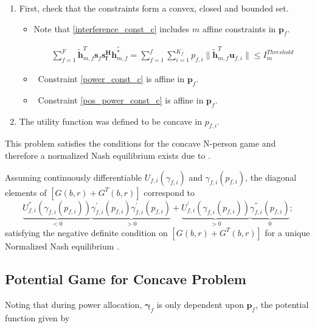 \begin{enumerate}


\item
First, check that the constraints form a convex, closed and bounded set. 

\begin{itemize}

\item
	Note that \eqref{interference_const_c} includes $m$ affine constraints in $\mathbf{p}_{f}$.

\begin{gather*}
	  \sum^F_{f=1} \tilde{\mathbf{h}}_{m,f}^T  \mathbf{s}_{f} 						
	\mathbf{s_{f}^{H}} \tilde{\mathbf{h}_{m,f}^*} 
	=
	\sum_{f=1}^{f}	\sum_{i=1}^{K_f}
	p_{f,i}\|\tilde{\mathbf{h}}_{m,f}^T \mathbf{u}_{f,i}\|
	\leq I^{Threshold}_{m} 
\end{gather*}

\item \
	Constraint \eqref{power_const_c} is  affine in $\mathbf{p}_{f}$.
	
\item \
	Constraint \eqref{pos_power_const_c} is affine in $\mathbf{p}_{f}$.
\end{itemize}


\item The utility function was defined to be concave in $p_{f,i}$. 

\end{enumerate}

This problem satisfies the conditions for the concave N-person game and therefore a  normalized Nash equilibrium exists due to 
\cite[Thm1]{rosen1964existence}.

Assuming continuously differentiable $U_{f,i}(\gamma_{f,i})$ and $\gamma_{f,i}(p_{f,i})$, the diagonal elements of $[G(b,r)+G^{T}(b,r)] $ correspond to
\begin{equation}
\underbrace{U^{''}_{f,i}(\gamma_{f,i}(p_{f,i}))}_{<0}\underbrace{\gamma^{'}_{f,i}(p_{f,i})\gamma^{'}_{f,i}(p_{f,i})}_{>0}
+
\underbrace{U^{'}_{f,i}(\gamma_{f,i}(p_{f,i}))}_{>0}\underbrace{\gamma^{''}_{f,i}(p_{f,i})}_{0};
\end{equation}
satisfying the  negative definite condition on $[G(b,r)+G^{T}(b,r)] $ for a unique Normalized Nash equilibrium \cite[Thm4]{rosen1964existence}.

\subsection{Potential Game for Concave Problem}
Noting that during power allocation, $\boldsymbol{\gamma}_{f}$ is only dependent upon $\mathbf{p}_f$, the potential function given by 


